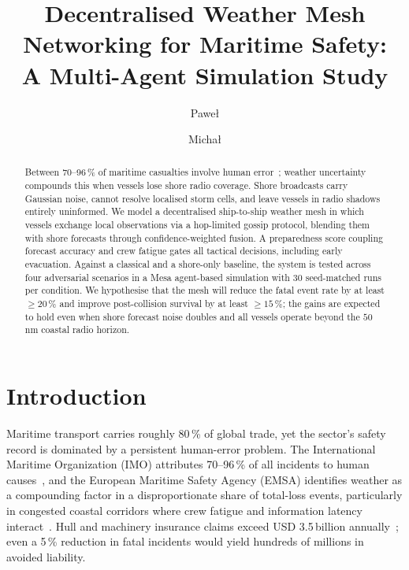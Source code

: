 \documentclass[cameraready]{Interspeech}
\title{Decentralised Weather Mesh Networking for Maritime Safety:\\
       A Multi-Agent Simulation Study}
\author[affiliation={1}]{Pawe\l}{Pozorski}
\author[affiliation={1}]{Micha\l}{Pytel}
\begin{document}
\maketitle

\begin{abstract}
Between 70--96\,\% of maritime casualties involve human error~\cite{imohuman2018}; weather uncertainty compounds this when vessels lose shore radio coverage. Shore broadcasts carry Gaussian noise, cannot resolve localised storm cells, and leave vessels in radio shadows entirely uninformed. We model a decentralised ship-to-ship weather mesh in which vessels exchange local observations via a hop-limited gossip protocol, blending them with shore forecasts through confidence-weighted fusion. A preparedness score coupling forecast accuracy and crew fatigue gates all tactical decisions, including early evacuation. Against a classical and a shore-only baseline, the system is tested across four adversarial scenarios in a Mesa agent-based simulation with 30 seed-matched runs per condition. We hypothesise that the mesh will reduce the fatal event rate by at least ${\geq}20\,\%$ and improve post-collision survival by at least ${\geq}15\,\%$; the gains are expected to hold even when shore forecast noise doubles and all vessels operate beyond the $50$\,nm coastal radio horizon.
\end{abstract}

\section{Introduction}
\label{sec:intro}

Maritime transport carries roughly 80\,\% of global trade, yet the sector's safety record is dominated by a persistent human-error problem. The International Maritime Organization (IMO) attributes 70--96\,\% of all incidents to human causes~\cite{imohuman2018}, and the European Maritime Safety Agency (EMSA) identifies weather as a compounding factor in a disproportionate share of total-loss events, particularly in congested coastal corridors where crew fatigue and information latency interact~\cite{emsa2023}. Hull and machinery insurance claims exceed USD 3.5\,billion annually~\cite{iumi2023}; even a 5\,\% reduction in fatal incidents would yield hundreds of millions in avoided liability.
\end{document}
